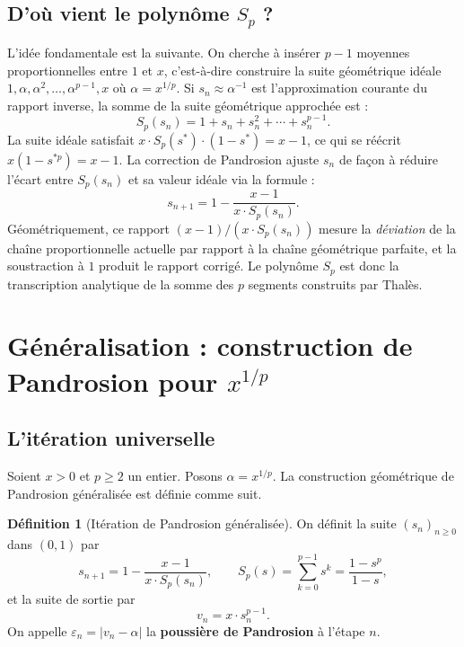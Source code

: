 \documentclass[11pt,a4paper]{article}
\theoremstyle{definition}
\newtheorem{definition}{Définition}[section]
\newcommand{\eps}{\varepsilon}
\begin{document}
\subsection{D'où vient le polynôme $S_p$ ?}

L'idée fondamentale est la suivante. On cherche à insérer $p-1$ moyennes proportionnelles entre $1$ et $x$, c'est-à-dire construire la suite géométrique idéale $1, \alpha, \alpha^2, \ldots, \alpha^{p-1}, x$ où $\alpha = x^{1/p}$. Si $s_n \approx \alpha^{-1}$ est l'approximation courante du rapport inverse, la somme de la suite géométrique approchée est :
\[
  S_p(s_n) = 1 + s_n + s_n^2 + \cdots + s_n^{p-1}.
\]
La suite idéale satisfait $x \cdot S_p(s^*) \cdot (1-s^*) = x-1$, ce qui se réécrit $x(1-s^{*p}) = x-1$. La correction de Pandrosion ajuste $s_n$ de façon à réduire l'écart entre $S_p(s_n)$ et sa valeur idéale via la formule :
\[
  s_{n+1} = 1 - \frac{x-1}{x \cdot S_p(s_n)}.
\]
Géométriquement, ce rapport $(x-1)/(x \cdot S_p(s_n))$ mesure la \emph{déviation} de la chaîne proportionnelle actuelle par rapport à la chaîne géométrique parfaite, et la soustraction à $1$ produit le rapport corrigé. Le polynôme $S_p$ est donc la transcription analytique de la somme des $p$ segments construits par Thalès.

\section{Généralisation : construction de Pandrosion pour \texorpdfstring{$x^{1/p}$}{x\^{}(1/p)}}
\label{sec:generalisation}

\subsection{L'itération universelle}

Soient $x > 0$ et $p \geq 2$ un entier. Posons $\alpha = x^{1/p}$. La construction géométrique de Pandrosion généralisée est définie comme suit.

\begin{definition}[Itération de Pandrosion généralisée]
\label{def:pandrosion_gen}
On définit la suite $(s_n)_{n \geq 0}$ dans $(0, 1)$ par
\begin{equation}
  \label{eq:pandrosion_gen}
  s_{n+1} = 1 - \frac{x - 1}{x \cdot S_p(s_n)},
  \qquad
  S_p(s) = \sum_{k=0}^{p-1} s^k = \frac{1 - s^p}{1 - s},
\end{equation}
et la suite de sortie par
\begin{equation}
  \label{eq:vn_gen}
  v_n = x \cdot s_n^{p-1}.
\end{equation}
On appelle $\eps_n = |v_n - \alpha|$ la \textbf{poussière de Pandrosion} à l'étape $n$.
\end{definition}
\end{document}

